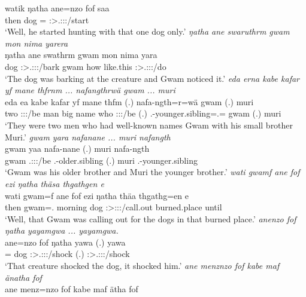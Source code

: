 \begin{exe}
	\gll watik ŋatha ane=nzo fof saa\\ 
	then dog \Dem={\Only} {\Emph} \Sg:\Sbj>\Tsg.\Masc:\Obj:\Pst:\Pfv/start\\
	\trans `Well, he started hunting with that one dog only.'
	\emph{ŋatha ane swaruthrm gwam mon nima yarera}\\
	\gll ŋatha ane swathrm gwam mon nima yara\\ 
	dog {\Dem} \Sg:\Sbj>\Tsg.\Masc:\Io:\Pst:\Dur/bark gwam how like.this \Sg:\Sbj>\Tsg.\Masc:\Io:\Pst:\Ipfv/do\\
	\trans `The dog was barking at the creature and Gwam noticed it.'
	\emph{eda erna kabe kafar yf mane thfrnm ... nafangthrwä gwam ... muri}\\
	\gll eda ea kabe kafar yf mane thfm (.) nafa-ngth=r=wä gwam (.) muri\\ 
	two \Stdu:\Sbj:\Pst:\Ipfv/be man big name who \Stdu:\Sbj:\Pst:\Dur/be (.) \Third.\Poss-younger.sibling=\Assoc.\Du={\Emph} gwam (.) muri\\
	\trans `They were two men who had well-known names Gwam with his small brother Muri.'
	\emph{gwam yara nafanane ... muri nafangth}\\
	\gll gwam yaa nafa-nane (.) muri nafa-ngth\\ 
	gwam \Tsg.\Masc:\Sbj:\Pst:\Ipfv/be \Third.\Poss-older.sibling (.) muri \Third.\Poss-younger.sibling\\
	\trans `Gwam was his older brother and Muri the younger brother.'
	\emph{wati gwamf ane fof ezi ŋatha thäsa thgathgen e}\\
	\gll wati gwam=f ane fof ezi ŋatha thäa thgathg=en e\\ 
	then gwam=\Erg.{\Sg} {\Dem} {\Emph} morning dog \Sg:\Sbj>\Stpl:\Obj:\Pst:\Pfv/call.out burned.place until\\
	\trans `Well, that Gwam was calling out for the dogs in that burned place.'
	\emph{anenzo fof ŋatha yayamgwa ... yayamgwa.}\\
	\gll ane=nzo fof ŋatha yawa (.) yawa\\ 
	\Dem={\Only} {\Emph} dog \Sg:\Sbj>\Tsg.\Masc:\Obj:\Pst:\Ipfv/shock (.) \Sg:\Sbj>\Tsg.\Masc:\Obj:\Pst:\Ipfv/shock\\
	\trans `That creature shocked the dog, it shocked him.'
\newpage 	
{} 
	\emph{ane menznzo fof kabe maf änatha fof}\\
	\gll ane menz=nzo fof kabe maf ätha fof\\ 

\end{exe}
